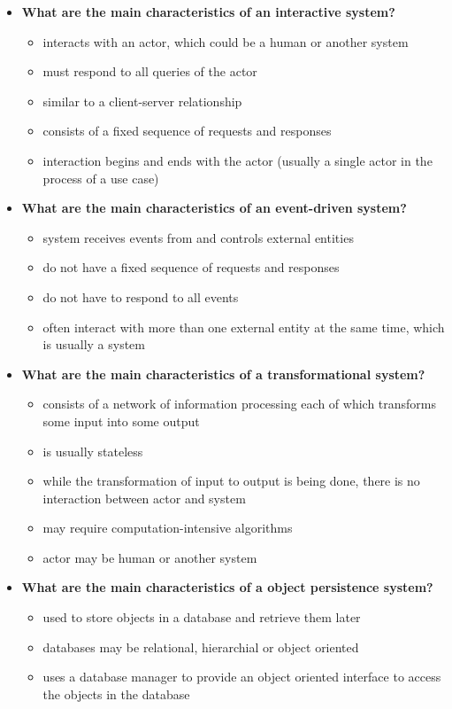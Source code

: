 \documentclass[12pt,letterpaper,titlepage,en-US]{article}
\begin{document}
  \begin{itemize}
\item \textbf{What are the main characteristics of an interactive system?}
\begin{itemize}[noitemsep]
\item interacts with an actor, which could be a human or another system
\item must respond to all queries of the actor
\item similar to a client-server relationship
\item consists of a fixed sequence of requests and responses
\item interaction begins and ends with the actor (usually a single actor in the process of a use case)
\end{itemize}
        
        

\item \textbf{What are the main characteristics of an event-driven system?}
\begin{itemize}[noitemsep,nolistsep]
\item system receives events from and controls external entities
\item do not have a fixed sequence of requests and responses
\item do not have to respond to all events
\item often interact with more than one external entity at the same time, which is usually a system
\end{itemize}


\item \textbf{What are the main characteristics of a transformational system?}
\begin{itemize}[noitemsep,nolistsep]
\item consists of a network of information processing each of which transforms some input into some output
\item is usually stateless
\item while the transformation of input to output is being done, there is no interaction between actor and system
\item may require computation-intensive algorithms
\item actor may be human or another system
\end{itemize}


\item \textbf{What are the main characteristics of a object persistence system?}
\begin{itemize}[noitemsep,nolistsep]
\item used to store objects in a database and retrieve them later
\item databases may be relational, hierarchial or object oriented
\item uses a database manager to provide an object oriented interface to access the objects in the database
\end{itemize}

\end{itemize}
        
\end{document}
